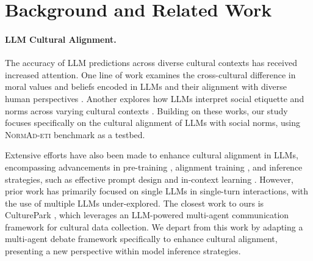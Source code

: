 \section{Background and Related Work}

\paragraph{LLM Cultural Alignment.}
The accuracy of LLM predictions across diverse cultural contexts has received increased attention. One line of work examines the cross-cultural difference in moral values and beliefs encoded in LLMs and their alignment with diverse human perspectives \cite{moralstories, moralencoded, jinnai-2024-cross, cao-etal-2023-assessing, arora-etal-2023-probing, trollymultilingual}. Another explores how LLMs interpret social etiquette and norms across varying cultural contexts \cite{farperspective, normdial, renovi, culturebank, normad, normbank}. Building on these works, our study focuses specifically on the cultural alignment of LLMs with social norms, using \textsc{NormAd-eti} \cite{normad} benchmark as a testbed.





Extensive efforts have also been made to enhance cultural alignment in LLMs, encompassing advancements in pre-training \cite{acegpt, seallm, wang-etal-2024-countries}, alignment training \cite{choenni-etal-2024-echoes, culturellm, mukherjee-etal-2024-global}, and inference strategies, such as effective prompt design \cite{investigating, cao-etal-2023-assessing, shen-etal-2024-understanding} and in-context learning \cite{selfalignment, lahoti-etal-2023-improving}. However, prior work has primarily focused on single LLMs in single-turn interactions, with the use of multiple LLMs under-explored. The closest work to ours is CulturePark \cite{culturepark}, which leverages an LLM-powered multi-agent communication framework for cultural data collection. We depart from this work by adapting a multi-agent debate framework specifically to enhance cultural alignment, presenting a new perspective within model inference strategies.


